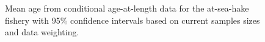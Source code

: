 \documentclass[
]{scrartcl}
\begin{document}
\begin{figure}[H]


\caption{\label{fig-ashop-mean-caal}Mean age from conditional
age-at-length data for the at-sea-hake fishery with 95\% confidence
intervals based on current samples sizes and data weighting.}

\end{figure}%
\end{document}
